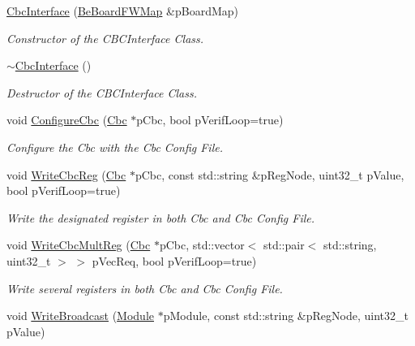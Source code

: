 \begin{DoxyCompactItemize}
\item 
\hyperlink{class_ph2___hw_interface_1_1_cbc_interface_a405f25c67abece1967d0bd0d738afbe1}{Cbc\-Interface} (\hyperlink{namespace_ph2___hw_interface_ac35d341eb47fa7cbe4d28ccbc6ab4875}{Be\-Board\-F\-W\-Map} \&p\-Board\-Map)
\begin{DoxyCompactList}\small\item\em Constructor of the C\-B\-C\-Interface Class. \end{DoxyCompactList}\item 
\hyperlink{class_ph2___hw_interface_1_1_cbc_interface_a1f0ab7d7cf7783a0fe275e8e1d7e5a49}{$\sim$\-Cbc\-Interface} ()
\begin{DoxyCompactList}\small\item\em Destructor of the C\-B\-C\-Interface Class. \end{DoxyCompactList}\item 
void \hyperlink{class_ph2___hw_interface_1_1_cbc_interface_a845ae259c43b47f62ce58aacc042f491}{Configure\-Cbc} (\hyperlink{class_ph2___hw_description_1_1_cbc}{Cbc} $\ast$p\-Cbc, bool p\-Verif\-Loop=true)
\begin{DoxyCompactList}\small\item\em Configure the Cbc with the Cbc Config File. \end{DoxyCompactList}\item 
void \hyperlink{class_ph2___hw_interface_1_1_cbc_interface_a79c8fdfaadf8d6c5d39d758c3287aa8f}{Write\-Cbc\-Reg} (\hyperlink{class_ph2___hw_description_1_1_cbc}{Cbc} $\ast$p\-Cbc, const std\-::string \&p\-Reg\-Node, uint32\-\_\-t p\-Value, bool p\-Verif\-Loop=true)
\begin{DoxyCompactList}\small\item\em Write the designated register in both Cbc and Cbc Config File. \end{DoxyCompactList}\item 
void \hyperlink{class_ph2___hw_interface_1_1_cbc_interface_ae2556519ada94db825a9759b76eb6d0d}{Write\-Cbc\-Mult\-Reg} (\hyperlink{class_ph2___hw_description_1_1_cbc}{Cbc} $\ast$p\-Cbc, std\-::vector$<$ std\-::pair$<$ std\-::string, uint32\-\_\-t $>$ $>$ p\-Vec\-Req, bool p\-Verif\-Loop=true)
\begin{DoxyCompactList}\small\item\em Write several registers in both Cbc and Cbc Config File. \end{DoxyCompactList}\item 
void \hyperlink{class_ph2___hw_interface_1_1_cbc_interface_a81a03fe5d5d0791ff1b2cab92f6fbcdd}{Write\-Broadcast} (\hyperlink{class_ph2___hw_description_1_1_module}{Module} $\ast$p\-Module, const std\-::string \&p\-Reg\-Node, uint32\-\_\-t p\-Value)

\end{DoxyCompactItemize}
